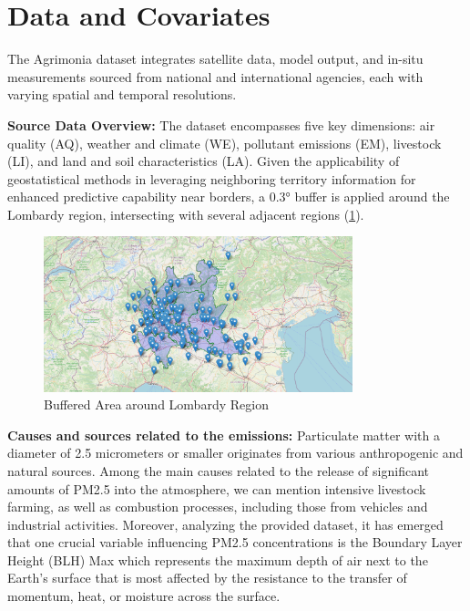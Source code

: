 \documentclass[12pt,a4paper]{article}
\begin{document}
\section{Data and Covariates}
The Agrimonia dataset integrates satellite data, model output, and in-situ measurements sourced from national and international agencies, each with varying spatial and temporal resolutions. 

\textbf{Source Data Overview:}
The dataset encompasses five key dimensions: air quality (AQ), weather and climate (WE), pollutant emissions (EM), livestock (LI), and land and soil characteristics (LA). Given the applicability of geostatistical methods in leveraging neighboring territory information for enhanced predictive capability near borders, a 0.3° buffer is applied around the Lombardy region, intersecting with several adjacent regions (\cref{fig:buffered_area}).

\begin{figure}
    \centering
    
    \includegraphics[width=0.8\textwidth]{./imgs/maps/mappa.png}
    \caption{Buffered Area around Lombardy Region}
    \label{fig:buffered_area}
\end{figure}
\textbf{Causes and sources related to the emissions:}
Particulate matter with a diameter of 2.5 micrometers or smaller originates from various anthropogenic and natural sources. Among the main causes related to the release of significant amounts of PM2.5 into the atmosphere, we can mention intensive livestock farming, as well as combustion processes, including those from vehicles and industrial activities.
Moreover, analyzing the provided dataset, it has emerged that one crucial variable influencing PM2.5 concentrations is the Boundary Layer Height (BLH) Max which represents the maximum depth of air next to the Earth's surface that is most affected by the resistance to the transfer of momentum, heat, or moisture across the surface. 
\end{document}
